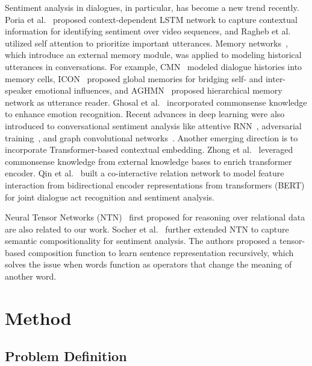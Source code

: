 \documentclass[journal]{IEEEtran}
\begin{document}
Sentiment analysis in dialogues, in particular, has become a new trend recently. 
Poria et al.~\cite{poria2017context} proposed context-dependent LSTM network to capture contextual information for identifying sentiment over video sequences, and Ragheb et al.~\cite{ragheb2019attention} utilized self attention to prioritize important utterances.
Memory networks~\cite{sukhbaatar2015end}, which introduce an external memory module, was applied to modeling historical utterances in conversations. For example, CMN~\cite{hazarika2018conversational} modeled dialogue histories into memory cells, ICON~\cite{hazarika2018icon} proposed global memories for bridging self- and inter-speaker emotional influences, and AGHMN~\cite{jiao2019real} proposed hierarchical memory network as utterance reader.
{Ghosal et al.~\cite{ghosal2020cosmic} incorporated commonsense knowledge to enhance emotion recognition.} 
Recent advances in deep learning were also introduced to conversational sentiment analysis like attentive RNN~\cite{majumder2019dialoguernn}, adversarial training~\cite{wang2019capturing}, and graph convolutional networks~\cite{ghosal2019dialoguegcn}.
Another emerging direction is to incorporate Transformer-based contextual embedding.
Zhong et al.~\cite{zhong2019knowledge} leveraged commonsense knowledge from external knowledge bases to enrich transformer encoder. 
Qin et al.~\cite{qin2020dcr} built a co-interactive relation network to model feature interaction from bidirectional encoder representations from transformers (BERT) for joint dialogue act recognition and sentiment analysis. 


Neural Tensor Networks (NTN)~\cite{socher2013reasoning} first proposed for reasoning over relational data are also related to our work. Socher et al.~\cite{socher2013recursive} further extended NTN to capture semantic compositionality for sentiment analysis. The authors proposed a tensor-based composition function to learn sentence representation recursively, which solves the issue when words function as operators that change the meaning of another word. 




\section{Method}
\label{sec:method}
\subsection{Problem Definition}
\end{document}
